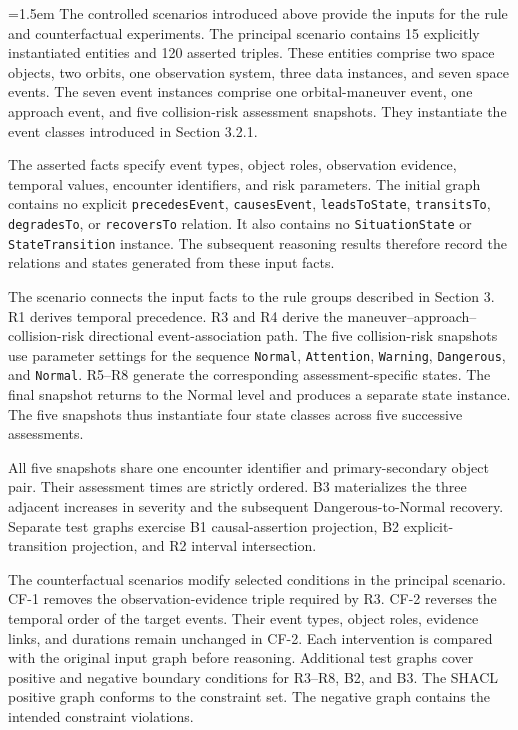 \documentclass[Royal,sageh,times]{sagej}
\newcommand{\ont}[1]{{\urlstyle{tt}\nolinkurl{#1}}}
\begin{document}
{\emergencystretch=1.5em
The controlled scenarios introduced above provide the inputs for the rule and counterfactual experiments. The principal scenario contains 15 explicitly instantiated entities and 120 asserted triples. These entities comprise two space objects, two orbits, one observation system, three data instances, and seven space events. The seven event instances comprise one orbital-maneuver event, one approach event, and five collision-risk assessment snapshots. They instantiate the event classes introduced in Section 3.2.1.

The asserted facts specify event types, object roles, observation evidence, temporal values, encounter identifiers, and risk parameters. The initial graph contains no explicit \ont{precedesEvent}, \ont{causesEvent}, \ont{leadsToState}, \ont{transitsTo}, \ont{degradesTo}, or \ont{recoversTo} relation. It also contains no \ont{SituationState} or \ont{StateTransition} instance. The subsequent reasoning results therefore record the relations and states generated from these input facts.

The scenario connects the input facts to the rule groups described in Section 3. R1 derives temporal precedence. R3 and R4 derive the maneuver--approach--collision-risk directional event-association path. The five collision-risk snapshots use parameter settings for the sequence \ont{Normal}, \ont{Attention}, \ont{Warning}, \ont{Dangerous}, and \ont{Normal}. R5--R8 generate the corresponding assessment-specific states. The final snapshot returns to the Normal level and produces a separate state instance. The five snapshots thus instantiate four state classes across five successive assessments.

All five snapshots share one encounter identifier and primary-secondary object pair. Their assessment times are strictly ordered. B3 materializes the three adjacent increases in severity and the subsequent Dangerous-to-Normal recovery. Separate test graphs exercise B1 causal-assertion projection, B2 explicit-transition projection, and R2 interval intersection.

The counterfactual scenarios modify selected conditions in the principal scenario. CF-1 removes the observation-evidence triple required by R3. CF-2 reverses the temporal order of the target events. Their event types, object roles, evidence links, and durations remain unchanged in CF-2. Each intervention is compared with the original input graph before reasoning. Additional test graphs cover positive and negative boundary conditions for R3--R8, B2, and B3. The SHACL positive graph conforms to the constraint set. The negative graph contains the intended constraint violations.\par}
\end{document}
